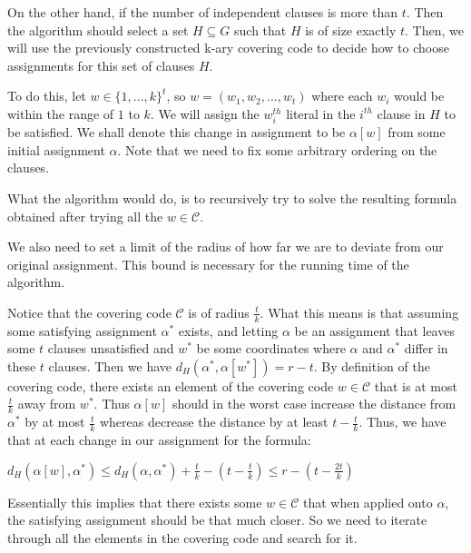 \documentclass[a4paper,12pts]{article}
\newcommand{\dist}[2]{d_H(#1,#2)}
\newcommand{\astar}{\alpha^*}
\newcommand{\kbits}{\{1,...,k\}}
\begin{document}
On the other hand, if the number of independent clauses is more than $t$. Then the algorithm should select a set $H \subseteq G$ such that $H$ is of size exactly $t$. Then, we will use the previously constructed k-ary covering code to decide how to choose assignments for this set of clauses $H$.\par

To do this, let $w \in \kbits^{t}$, so $w = (w_1, w_2, ..., w_t)$ where each $w_i$ would be within the range of $1$ to $k$. We will assign the $w_i^{th}$ literal in the $i^{th}$ clause in $H$ to be satisfied. We shall denote this change in assignment to be $\alpha[w]$ from some initial assignment $\alpha$. Note that we need to fix some arbitrary ordering on the clauses. \par

What the algorithm would do, is to recursively try to solve the resulting formula obtained after trying all the $w \in \mathcal{C}$. 

We also need to set a limit of the radius of how far we are to deviate from our original assignment. This bound is necessary for the running time of the algorithm.\par

Notice that the covering code $\mathcal{C}$ is of radius $\frac{t}{k}$. What this means is that assuming some satisfying assignment $\alpha^*$ exists, and letting $\alpha$ be an assignment that leaves some $t$ clauses unsatisfied and $w^*$ be some coordinates where $\alpha$ and $\astar$ differ in these $t$ clauses. Then we have $\dist{\astar}{\alpha[w^*]} = r-t$. By definition of the covering code, there exists an element of the covering code $w \in \mathcal{C}$ that is at most $\frac{t}{k}$ away from $w^*$. Thus $
\alpha[w]$ should in the worst case increase the distance from $\astar$ by at most $\frac{t}{k}$ whereas decrease the distance by at least $t - \frac{t}{k}$. Thus, we have that at each change in our assignment for the formula: \par

\begin{center}
	$d_H(\alpha[w], \alpha^{*}) \leq d_H(\alpha, \alpha^{*}) + \frac{t}{k} - (t - \frac{t}{k}) \leq r - (t - \frac{2t}{k})$
\end{center}

Essentially this implies that there exists some $w \in \mathcal{C}$ that when applied onto $\alpha$, the satisfying assignment should be that much closer. So we need to iterate through all the elements in the covering code and search for it.\par
\end{document}
